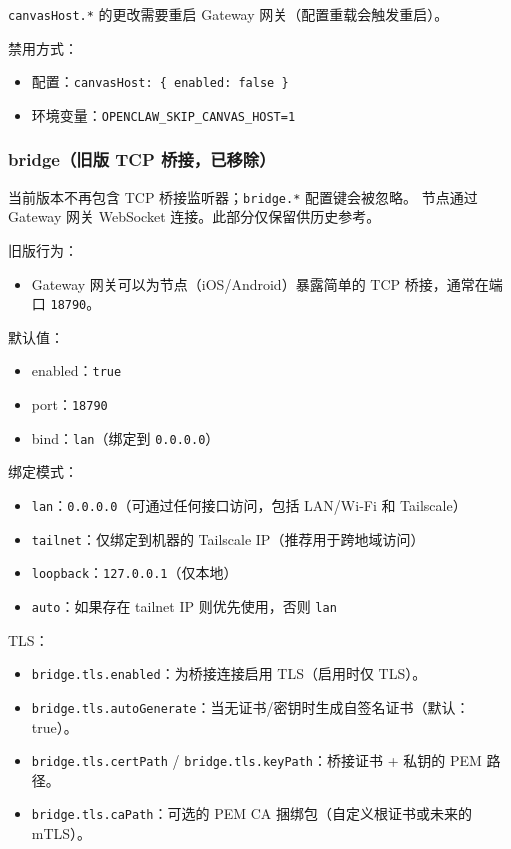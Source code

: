 \texttt{canvasHost.*} 的更改需要重启 Gateway 网关（配置重载会触发重启）。

禁用方式：

\begin{itemize}
  \item 配置：\texttt{canvasHost: \{ enabled: false \}}
  \item 环境变量：\texttt{OPENCLAW\_SKIP\_CANVAS\_HOST=1}
\end{itemize}


\subsubsection{bridge（旧版 TCP 桥接，已移除）}


当前版本不再包含 TCP 桥接监听器；\texttt{bridge.*} 配置键会被忽略。
节点通过 Gateway 网关 WebSocket 连接。此部分仅保留供历史参考。

旧版行为：

\begin{itemize}
  \item Gateway 网关可以为节点（iOS/Android）暴露简单的 TCP 桥接，通常在端口 \texttt{18790}。
\end{itemize}


默认值：

\begin{itemize}
  \item enabled：\texttt{true}
  \item port：\texttt{18790}
  \item bind：\texttt{lan}（绑定到 \texttt{0.0.0.0}）
\end{itemize}


绑定模式：

\begin{itemize}
  \item \texttt{lan}：\texttt{0.0.0.0}（可通过任何接口访问，包括 LAN/Wi‑Fi 和 Tailscale）
  \item \texttt{tailnet}：仅绑定到机器的 Tailscale IP（推荐用于跨地域访问）
  \item \texttt{loopback}：\texttt{127.0.0.1}（仅本地）
  \item \texttt{auto}：如果存在 tailnet IP 则优先使用，否则 \texttt{lan}
\end{itemize}


TLS：

\begin{itemize}
  \item \texttt{bridge.tls.enabled}：为桥接连接启用 TLS（启用时仅 TLS）。
  \item \texttt{bridge.tls.autoGenerate}：当无证书/密钥时生成自签名证书（默认：true）。
  \item \texttt{bridge.tls.certPath} / \texttt{bridge.tls.keyPath}：桥接证书 + 私钥的 PEM 路径。
  \item \texttt{bridge.tls.caPath}：可选的 PEM CA 捆绑包（自定义根证书或未来的 mTLS）。
\end{itemize}


